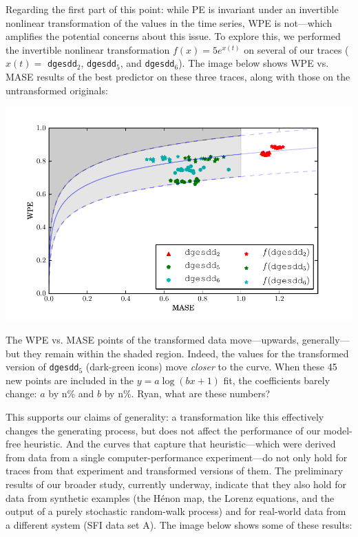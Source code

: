 \documentclass[12pt]{article}
\newcommand{\alert}[1]{{\color{red}#1}}
\begin{document}
Regarding the first part of this point: while PE is invariant under an
invertible nonlinear transformation of the values in the time series,
WPE is not---which amplifies the potential concerns about this issue.
To explore this, we performed the invertible nonlinear transformation
$f(x)=5e^{x(t)}$ on several of our traces ($x(t)=$ {\tt dgesdd}$_2$,
{\tt dgesdd}$_5$, and {\tt dgesdd}$_6$).  The image below shows WPE
vs. MASE results of the best predictor on these three traces, along
with those on the untransformed originals:

\begin{center}
    \includegraphics[width=0.8\columnwidth]{figs/nonlinear_transform_data}
\end{center}

The WPE vs. MASE points of the transformed data move---upwards,
generally---but they remain within the shaded region.  Indeed, the
values for the transformed version of {\tt dgesdd}$_5$ (dark-green
icons) move {\sl closer} to the curve.  When these 45 new points are
included in the $y = a \log(b x + 1)$ fit, the coefficients
\alert{barely change: $a$ by n\% and $b$ by n\%.  Ryan, what are these
  numbers?}

This supports our claims of generality: a transformation like this
effectively changes the generating process, but does not affect the
performance of our model-free heuristic.  And the curves that capture
that heuristic---which were derived from data from a single
computer-performance experiment---do not only hold for traces from
that experiment and transformed versions of them.  The preliminary
results of our broader study, currently underway, indicate that they
also hold for data from synthetic examples (the H\'{e}non map, the
Lorenz equations, and the output of a purely stochastic random-walk
process) and for real-world data from a different system (SFI data set
A).  The image below shows some of these results:
\end{document}
